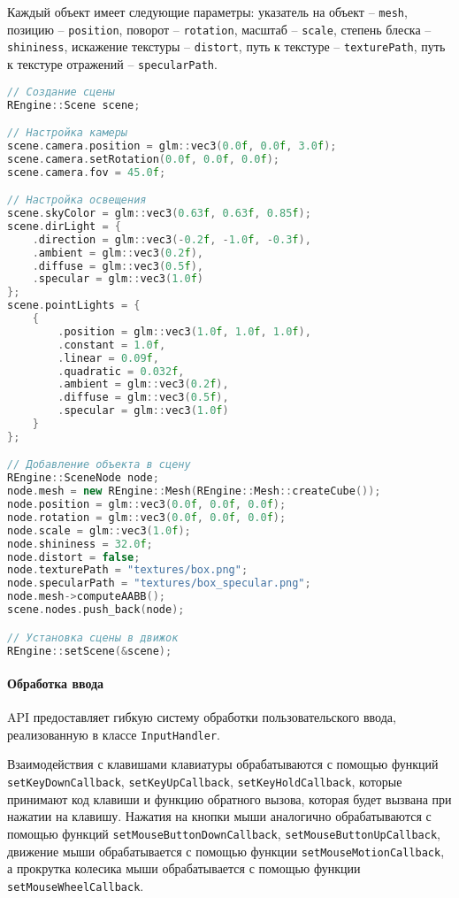 Каждый объект имеет следующие параметры: указатель на объект -- \texttt{mesh}, позицию -- \texttt{position}, поворот -- \texttt{rotation}, масштаб -- \texttt{scale}, степень блеска -- \texttt{shininess}, искажение текстуры -- \texttt{distort}, путь к текстуре -- \texttt{texturePath}, путь к текстуре отражений -- \texttt{specularPath}.

\begin{lstlisting}[language=C++, caption=Пример работы со сценой]
// Создание сцены
REngine::Scene scene;

// Настройка камеры
scene.camera.position = glm::vec3(0.0f, 0.0f, 3.0f);
scene.camera.setRotation(0.0f, 0.0f, 0.0f);
scene.camera.fov = 45.0f;

// Настройка освещения
scene.skyColor = glm::vec3(0.63f, 0.63f, 0.85f);
scene.dirLight = {
    .direction = glm::vec3(-0.2f, -1.0f, -0.3f),
    .ambient = glm::vec3(0.2f),
    .diffuse = glm::vec3(0.5f),
    .specular = glm::vec3(1.0f)
};
scene.pointLights = {
    {
        .position = glm::vec3(1.0f, 1.0f, 1.0f),
        .constant = 1.0f,
        .linear = 0.09f,
        .quadratic = 0.032f,
        .ambient = glm::vec3(0.2f),
        .diffuse = glm::vec3(0.5f),
        .specular = glm::vec3(1.0f)
    }
};

// Добавление объекта в сцену
REngine::SceneNode node;
node.mesh = new REngine::Mesh(REngine::Mesh::createCube());
node.position = glm::vec3(0.0f, 0.0f, 0.0f);
node.rotation = glm::vec3(0.0f, 0.0f, 0.0f);
node.scale = glm::vec3(1.0f);
node.shininess = 32.0f;
node.distort = false;
node.texturePath = "textures/box.png";
node.specularPath = "textures/box_specular.png";
node.mesh->computeAABB();
scene.nodes.push_back(node);

// Установка сцены в движок
REngine::setScene(&scene);
\end{lstlisting}

\paragraph{Обработка ввода}

API предоставляет гибкую систему обработки пользовательского ввода, реализованную в классе \texttt{InputHandler}.

Взаимодействия с клавишами клавиатуры обрабатываются с помощью функций \texttt{setKeyDownCallback}, \texttt{setKeyUpCallback}, \texttt{setKeyHoldCallback}, которые принимают код клавиши и функцию обратного вызова, которая будет вызвана при нажатии на клавишу. Нажатия на кнопки мыши аналогично обрабатываются с помощью функций \texttt{setMouseButtonDownCallback}, \texttt{setMouseButtonUpCallback}, движение мыши обрабатывается с помощью функции \texttt{setMouseMotionCallback}, а прокрутка колесика мыши обрабатывается с помощью функции \texttt{setMouseWheelCallback}.

